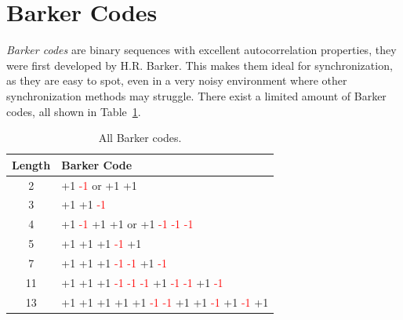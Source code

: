 \section{Barker Codes}
\textit{Barker codes} are binary sequences with excellent autocorrelation properties, they were first developed by H.R. Barker. This makes them ideal for synchronization, as they are easy to spot, even in a very noisy environment where other synchronization methods may struggle. There exist a limited amount of Barker codes, all shown in Table~\ref{tab:barker_codes}.
\begin{table}[h]
    \label{tab:barker_codes}
    \centering
    \renewcommand{\arraystretch}{1.3}
    \begin{tabular}{|c|l|}
        \hline
        \textbf{Length} & \textbf{Barker Code} \\ 
        \hline
        2 & \textcolor{green!50!black}{+1} \textcolor{red}{-1} \quad or \quad \textcolor{green!50!black}{+1} \textcolor{green!50!black}{+1} \\ 
        \hline
        3 & \textcolor{green!50!black}{+1} \textcolor{green!50!black}{+1} \textcolor{red}{-1} \\ 
        \hline
        4 & \textcolor{green!50!black}{+1} \textcolor{red}{-1} \textcolor{green!50!black}{+1} \textcolor{green!50!black}{+1} \quad or \quad \textcolor{green!50!black}{+1} \textcolor{red}{-1} \textcolor{red}{-1} \textcolor{red}{-1} \\ 
        \hline
        5 & \textcolor{green!50!black}{+1} \textcolor{green!50!black}{+1} \textcolor{green!50!black}{+1} \textcolor{red}{-1} \textcolor{green!50!black}{+1} \\ 
        \hline
        7 & \textcolor{green!50!black}{+1} \textcolor{green!50!black}{+1} \textcolor{green!50!black}{+1} \textcolor{red}{-1} \textcolor{red}{-1} \textcolor{green!50!black}{+1} \textcolor{red}{-1} \\ 
        \hline
        11 & \textcolor{green!50!black}{+1} \textcolor{green!50!black}{+1} \textcolor{green!50!black}{+1} \textcolor{red}{-1} \textcolor{red}{-1} \textcolor{red}{-1} \textcolor{green!50!black}{+1} \textcolor{red}{-1} \textcolor{red}{-1} \textcolor{green!50!black}{+1} \textcolor{red}{-1} \\ 
        \hline
        13 & \textcolor{green!50!black}{+1} \textcolor{green!50!black}{+1} \textcolor{green!50!black}{+1} \textcolor{green!50!black}{+1} \textcolor{green!50!black}{+1} \textcolor{red}{-1} \textcolor{red}{-1} \textcolor{green!50!black}{+1} \textcolor{green!50!black}{+1} \textcolor{red}{-1} \textcolor{green!50!black}{+1} \textcolor{red}{-1} \textcolor{green!50!black}{+1} \\ 
        \hline
    \end{tabular}
    \caption{All Barker codes.}
    \label{tab:barker_codes}
\end{table}
